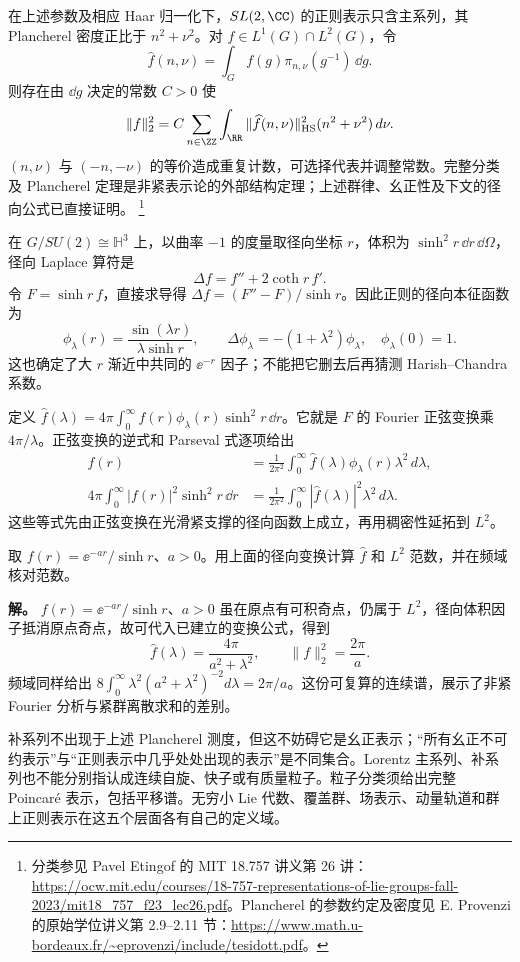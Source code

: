 \begin{theorem}
在上述参数及相应 Haar 归一化下，$SL(2,\CC)$ 的正则表示只含主系列，其 Plancherel 密度正比于 $n^2+\nu^2$。对 $f\in L^1(G)\cap L^2(G)$，令
\[
 \widehat f(n,\nu)=\int_G f(g)\pi_{n,\nu}(g^{-1})\,\dd g.
\]
则存在由 $\dd g$ 决定的常数 $C>0$ 使
\begin{equation}
 \|f\|_2^2=C\sum_{n\in\ZZ}\int_{\RR}
 \|\widehat f(n,\nu)\|_{\rm HS}^2(n^2+\nu^2)\,d\nu.
 \label{eq:plancherel-sl2c}
\end{equation}
$(n,\nu)$ 与 $(-n,-\nu)$ 的等价造成重复计数，可选择代表并调整常数。完整分类及 Plancherel 定理是非紧表示论的外部结构定理；上述群律、幺正性及下文的径向公式已直接证明。
\footnote{\raggedright 分类参见 Pavel Etingof 的 MIT 18.757 讲义第 26 讲：\url{https://ocw.mit.edu/courses/18-757-representations-of-lie-groups-fall-2023/mit18_757_f23_lec26.pdf}。Plancherel 的参数约定及密度见 E. Provenzi 的原始学位讲义第 2.9--2.11 节：\url{https://www.math.u-bordeaux.fr/~eprovenzi/include/tesidott.pdf}。}
\end{theorem}


在 $G/SU(2)\cong\mathbb H^3$ 上，以曲率 $-1$ 的度量取径向坐标 $r$，体积为 $\sinh^2r\,\dd r\,\dd \Omega$，径向 Laplace 算符是
\[
 \Delta f=f''+2\coth r\,f'.
\]
令 $F=\sinh r\,f$，直接求导得 $\Delta f=(F''-F)/\sinh r$。因此正则的径向本征函数为
\[
 \phi_\lambda(r)=\frac{\sin(\lambda r)}{\lambda\sinh r},\qquad
 \Delta\phi_\lambda=-(1+\lambda^2)\phi_\lambda,\quad \phi_\lambda(0)=1.
\]
这也确定了大 $r$ 渐近中共同的 $\ee^{-r}$ 因子；不能把它删去后再猜测 Harish--Chandra 系数。

定义 $\widehat f(\lambda)=4\pi\int_0^\infty f(r)\phi_\lambda(r)\sinh^2r\,\dd r$。它就是 $F$ 的 Fourier 正弦变换乘 $4\pi/\lambda$。正弦变换的逆式和 Parseval 式逐项给出
\begin{align*}
 f(r)&=\frac1{2\pi^2}\int_0^\infty\widehat f(\lambda)\phi_\lambda(r)\lambda^2\,d\lambda,\\
 4\pi\int_0^\infty|f(r)|^2\sinh^2r\,\dd r
 &=\frac1{2\pi^2}\int_0^\infty|\widehat f(\lambda)|^2\lambda^2\,d\lambda.
\end{align*}
这些等式先由正弦变换在光滑紧支撑的径向函数上成立，再用稠密性延拓到 $L^2$。
\begin{workedexample}[双曲空间上一个径向函数的变换与范数]
取 $f(r)=\ee^{-ar}/\sinh r$、$a>0$。用上面的径向变换计算 $\widehat f$ 和 $L^2$ 范数，并在频域核对范数。

\textbf{解。} $f(r)=\ee^{-ar}/\sinh r$、$a>0$ 虽在原点有可积奇点，仍属于 $L^2$，径向体积因子抵消原点奇点，故可代入已建立的变换公式，得到
\[
 \widehat f(\lambda)=\frac{4\pi}{a^2+\lambda^2},\qquad
 \|f\|_2^2=\frac{2\pi}{a}.
\]
频域同样给出 $8\int_0^\infty\lambda^2(a^2+\lambda^2)^{-2}d\lambda=2\pi/a$。这份可复算的连续谱，展示了非紧 Fourier 分析与紧群离散求和的差别。
\end{workedexample}

\begin{note}[表示参数与粒子分类的边界]
补系列不出现于上述 Plancherel 测度，但这不妨碍它是幺正表示；“所有幺正不可约表示”与“正则表示中几乎处处出现的表示”是不同集合。Lorentz 主系列、补系列也不能分别指认成连续自旋、快子或有质量粒子。粒子分类须给出完整 Poincar\'e 表示，包括平移谱。无穷小 Lie 代数、覆盖群、场表示、动量轨道和群上正则表示在这五个层面各有自己的定义域。
\end{note}
